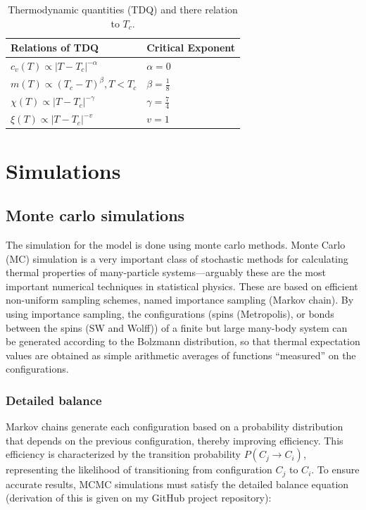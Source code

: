 \documentclass[a4paper,8pt]{article}
\begin{document}
\begin{table}[htbp]
    \centering
    \label{tab:tdq_critical_exponents}
    \begin{tabular}{l|l}
    \hline
    \textbf{Relations of TDQ} & \textbf{Critical Exponent} \\
    \hline
    $c_v(T) \propto |T-T_c|^{-\alpha}$ & $\alpha=0$ \\
    $m(T) \propto (T_c-T)^\beta, T<T_c$ & $\beta=\frac{1}{8}$ \\
    $\chi(T) \propto |T-T_c|^{-\gamma}$ & $\gamma=\frac{7}{4}$ \\
    $\xi(T) \propto |T-T_c|^{-v}$ & $v=1$ \\
    \hline
    \end{tabular}
    \caption{Thermodynamic quantities (TDQ) and there relation to $T_c$.}
\end{table}

\section{Simulations}
\subsection{Monte carlo simulations}
The simulation for the model is done using monte carlo methods. Monte Carlo (MC) simulation is a very important class of stochastic methods for calculating thermal properties of many-particle systems—arguably these are the most important numerical techniques in statistical physics. These are based on efficient non-uniform sampling schemes, named importance sampling (Markov chain). By using importance sampling, the configurations (spins (Metropolis), or bonds between the spins (SW and Wolff)) of a finite but large many-body system can be generated according to the Bolzmann distribution, so that thermal expectation values are obtained as simple arithmetic averages of functions “measured” on the configurations.

\subsubsection{Detailed balance}
Markov chains generate each configuration based on a probability distribution that depends on the previous configuration, thereby improving efficiency. This efficiency is characterized by the transition probability $P(C_{j} \rightarrow C_{i})$, representing the likelihood of transitioning from configuration $C_j$ to $C_i$. To ensure accurate results, MCMC simulations must satisfy the detailed balance equation (derivation of this is given on my GitHub project repository):
\end{document}
